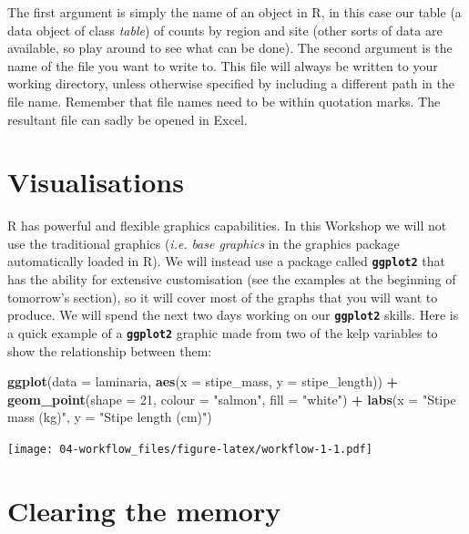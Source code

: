\documentclass[
]{book}
\newenvironment{Shaded}{\begin{snugshade}}{\end{snugshade}}
\newcommand{\DataTypeTok}[1]{\textcolor[rgb]{0.13,0.29,0.53}{#1}}
\newcommand{\DecValTok}[1]{\textcolor[rgb]{0.00,0.00,0.81}{#1}}
\newcommand{\KeywordTok}[1]{\textcolor[rgb]{0.13,0.29,0.53}{\textbf{#1}}}
\newcommand{\NormalTok}[1]{#1}
\newcommand{\OperatorTok}[1]{\textcolor[rgb]{0.81,0.36,0.00}{\textbf{#1}}}
\newcommand{\StringTok}[1]{\textcolor[rgb]{0.31,0.60,0.02}{#1}}
\begin{document}
The first argument is simply the name of an object in R, in this case our table (a data object of class \emph{table}) of counts by region and site (other sorts of data are available, so play around to see what can be done). The second argument is the name of the file you want to write to. This file will always be written to your working directory, unless otherwise specified by including a different path in the file name. Remember that file names need to be within quotation marks. The resultant file can sadly be opened in Excel.

\hypertarget{visualisations}{%
\section{Visualisations}\label{visualisations}}

R has powerful and flexible graphics capabilities. In this Workshop we will not use the traditional graphics (\emph{i.e.} \emph{base graphics} in the graphics package automatically loaded in R). We will instead use a package called \textbf{\texttt{ggplot2}} that has the ability for extensive customisation (see the examples at the beginning of tomorrow's section), so it will cover most of the graphs that you will want to produce. We will spend the next two days working on our \textbf{\texttt{ggplot2}} skills. Here is a quick example of a \textbf{\texttt{ggplot2}} graphic made from two of the kelp variables to show the relationship between them:

\begin{Shaded}
\begin{Highlighting}[]
\KeywordTok{ggplot}\NormalTok{(}\DataTypeTok{data =}\NormalTok{ laminaria, }\KeywordTok{aes}\NormalTok{(}\DataTypeTok{x =}\NormalTok{ stipe\_mass, }\DataTypeTok{y =}\NormalTok{ stipe\_length)) }\OperatorTok{+}
\StringTok{  }\KeywordTok{geom\_point}\NormalTok{(}\DataTypeTok{shape =} \DecValTok{21}\NormalTok{, }\DataTypeTok{colour =} \StringTok{"salmon"}\NormalTok{, }\DataTypeTok{fill =} \StringTok{"white"}\NormalTok{) }\OperatorTok{+}
\StringTok{  }\KeywordTok{labs}\NormalTok{(}\DataTypeTok{x =} \StringTok{"Stipe mass (kg)"}\NormalTok{, }\DataTypeTok{y =} \StringTok{"Stipe length (cm)"}\NormalTok{)}
\end{Highlighting}
\end{Shaded}

\texttt{[image: 04-workflow\_files/figure-latex/workflow-1-1.pdf]}

\hypertarget{clearing-the-memory}{%
\section{Clearing the memory}\label{clearing-the-memory}}
\end{document}
